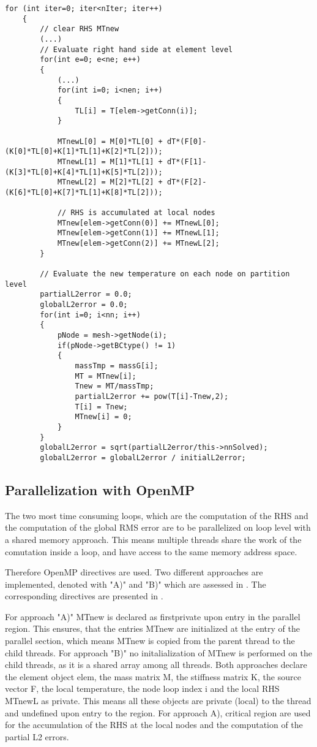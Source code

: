 \begin{lstlisting}[caption={\label{Code:Serial2} Explicit Solver}]
	for (int iter=0; iter<nIter; iter++)
	{
		// clear RHS MTnew
		(...)
		// Evaluate right hand side at element level
		for(int e=0; e<ne; e++)
		{
			(...)
			for(int i=0; i<nen; i++)
			{
				TL[i] = T[elem->getConn(i)];
			}
			
			MTnewL[0] = M[0]*TL[0] + dT*(F[0]-(K[0]*TL[0]+K[1]*TL[1]+K[2]*TL[2]));
			MTnewL[1] = M[1]*TL[1] + dT*(F[1]-(K[3]*TL[0]+K[4]*TL[1]+K[5]*TL[2]));
			MTnewL[2] = M[2]*TL[2] + dT*(F[2]-(K[6]*TL[0]+K[7]*TL[1]+K[8]*TL[2]));
			
			// RHS is accumulated at local nodes
			MTnew[elem->getConn(0)] += MTnewL[0];
			MTnew[elem->getConn(1)] += MTnewL[1];
			MTnew[elem->getConn(2)] += MTnewL[2];
		}
		
		// Evaluate the new temperature on each node on partition level
		partialL2error = 0.0;
		globalL2error = 0.0;
		for(int i=0; i<nn; i++)
		{
			pNode = mesh->getNode(i);
			if(pNode->getBCtype() != 1)
			{
				massTmp = massG[i];
				MT = MTnew[i];
				Tnew = MT/massTmp;
				partialL2error += pow(T[i]-Tnew,2);
				T[i] = Tnew;
				MTnew[i] = 0;
			}
		}
		globalL2error = sqrt(partialL2error/this->nnSolved);
		globalL2error = globalL2error / initialL2error;
\end{lstlisting}

\subsection{Parallelization with OpenMP \label{sec:POpenMP}}

The two most time consuming loops, which are the computation of the RHS and the computation of the global RMS error are to be parallelized on loop level with a shared memory approach. This means multiple threads share the work of the comutation inside a loop, and have access to the same memory address space.

Therefore OpenMP directives are used. Two different approaches are implemented, denoted with "A)" and "B)" which are assessed in . The corresponding directives are presented in .

For approach "A)" MTnew is declared as firstprivate upon entry in the parallel region. This ensures, that the entries MTnew are initialized at the entry of the parallel section, which means MTnew is copied from the parent thread to the child threads. For approach "B)" no initalialization of MTnew is performed on the child threads, as it is a shared array among all threads. Both approaches declare the element object elem, the mass matrix M, the stiffness matrix K, the source vector F, the local temperature, the node loop index i and the local RHS MTnewL as private. This means all these objects are private (local) to the thread and undefined upon entry to the region. For approach A), critical region are used for the accumulation of the RHS at the local nodes and the computation of the partial L2 errors. 

